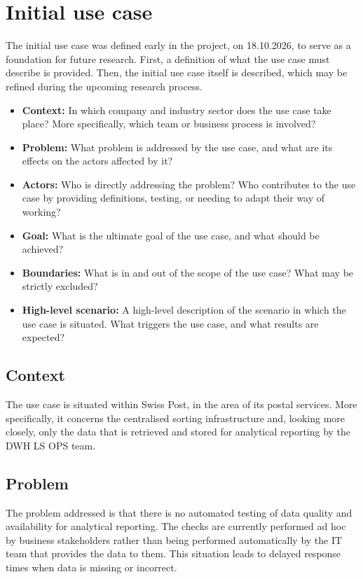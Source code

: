 


\section{Initial use case}

The initial use case was defined early in the project, on 18.10.2026, to serve as a foundation for future research.
First, a definition of what the use case must describe is provided. Then, the initial use case itself is described,  which may be refined during the upcoming research process.

\begin{itemize}
    \item \textbf{Context:} In which company and industry sector does the use case take place? More specifically, which team or business process is involved?

    \item \textbf{Problem:} What problem is addressed by the use case, and what are its effects on the actors affected by it?

    \item \textbf{Actors:} Who is directly addressing the problem? Who contributes to the use case by providing definitions, testing, or needing to adapt their way of working?

    \item \textbf{Goal:} What is the ultimate goal of the use case, and what should be achieved?

    \item \textbf{Boundaries:} What is in and out of the scope of the use case? What may be strictly excluded?

    \item \textbf{High-level scenario:} A high-level description of the scenario in which the use case is situated. What triggers the use case, and what results are expected?
\end{itemize}




\subsection*{Context}
The use case is situated within Swiss Post, in the area of its postal services. More specifically, it concerns the centralised sorting infrastructure and, looking more closely, only the data that is retrieved and stored for analytical reporting by the DWH LS OPS team.

\subsection*{Problem}
The problem addressed is that there is no automated testing of data quality and availability for analytical reporting. The checks are currently performed ad hoc by business stakeholders rather than being performed automatically by the IT team that provides the data to them. This situation leads to delayed response times when data is missing or incorrect.


